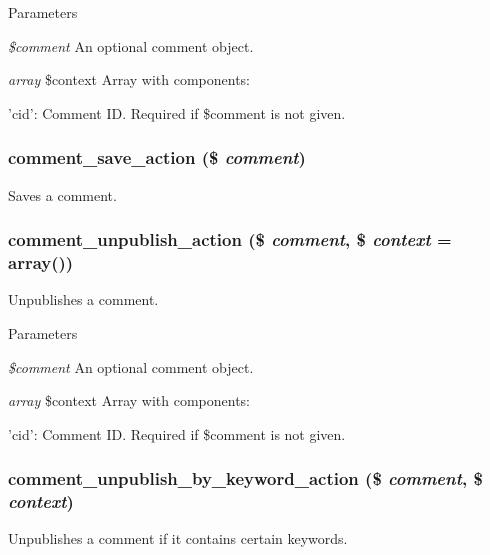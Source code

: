 \begin{DoxyParams}{Parameters}
\item[{\em \$comment}]An optional comment object. \item[{\em array}]\$context Array with components:
\begin{DoxyItemize}
\item 'cid': Comment ID. Required if \$comment is not given. 
\end{DoxyItemize}\end{DoxyParams}
\hypertarget{group__actions_ga074553675107cf7c8cac925d76666922}{
\subsubsection[{comment\_\-save\_\-action}]{\setlength{\rightskip}{0pt plus 5cm}comment\_\-save\_\-action (\$ {\em comment})}}
\label{group__actions_ga074553675107cf7c8cac925d76666922}
Saves a comment. \hypertarget{group__actions_gaa4f6361d453bff4f865f19bc369ecdfe}{
\subsubsection[{comment\_\-unpublish\_\-action}]{\setlength{\rightskip}{0pt plus 5cm}comment\_\-unpublish\_\-action (\$ {\em comment}, \/  \$ {\em context} = {\ttfamily array()})}}
\label{group__actions_gaa4f6361d453bff4f865f19bc369ecdfe}
Unpublishes a comment.


\begin{DoxyParams}{Parameters}
\item[{\em \$comment}]An optional comment object. \item[{\em array}]\$context Array with components:
\begin{DoxyItemize}
\item 'cid': Comment ID. Required if \$comment is not given. 
\end{DoxyItemize}\end{DoxyParams}
\hypertarget{group__actions_gaf5c19c791a33e0dc2b0bd3eb4fa79ba5}{
\subsubsection[{comment\_\-unpublish\_\-by\_\-keyword\_\-action}]{\setlength{\rightskip}{0pt plus 5cm}comment\_\-unpublish\_\-by\_\-keyword\_\-action (\$ {\em comment}, \/  \$ {\em context})}}
\label{group__actions_gaf5c19c791a33e0dc2b0bd3eb4fa79ba5}
Unpublishes a comment if it contains certain keywords.


